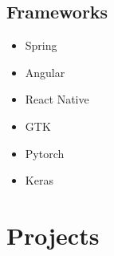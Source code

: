\documentclass{article}
\begin{document}
\subsection{Frameworks}
\begin{multicols}{3}
    \begin{itemize}
    	\item Spring
    	\item Angular
        \item React Native
        \item GTK
        \item Pytorch
        \item Keras
    \end{itemize}
\end{multicols}


\section{Projects}
\end{document}
